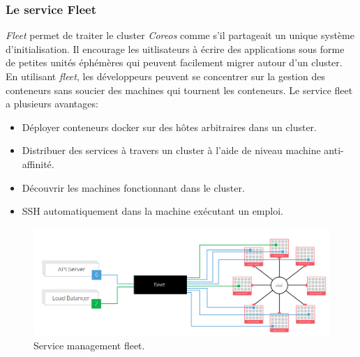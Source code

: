 \begin{onehalfspace}
\subsubsection{Le service Fleet}
\emph{Fleet} permet de traiter le cluster \emph{Coreos} comme s'il partageait un unique système d'initialisation. Il encourage les uitlisateurs à écrire des applications sous forme de petites unités éphémères qui peuvent facilement migrer autour d'un cluster. En utilisant \emph{fleet}, les développeurs peuvent se concentrer sur la gestion des conteneurs sans soucier des machines qui tournent les conteneurs. Le service fleet a plusieurs avantages: 
\begin{itemize}
\item Déployer conteneurs docker sur des hôtes arbitraires dans un cluster.
\item Distribuer des services à travers un cluster à l'aide de niveau machine anti-affinité.
\item Découvrir les machines fonctionnant dans le cluster.
\item SSH automatiquement dans la machine exécutant un emploi.
\end{itemize}
\begin{figure}[H]
\centering
\includegraphics [scale=0.5]{chapitre3/assets/fleet.png}
\caption{Service management fleet.}
\end{figure}
\end{onehalfspace}